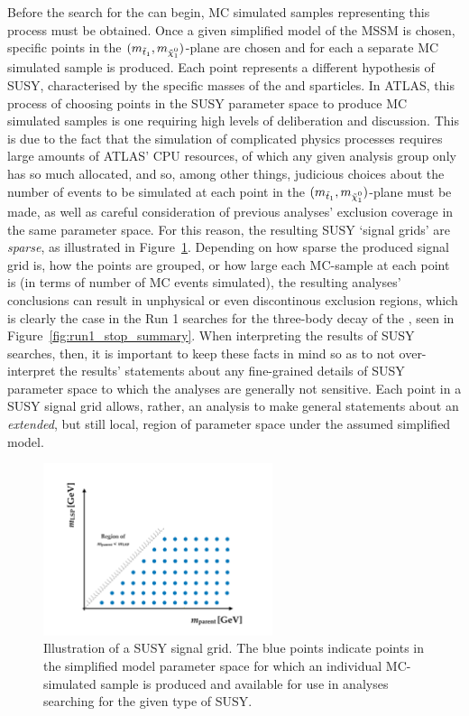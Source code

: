 Before the search for the \stopone can begin, MC simulated samples representing this process
must be obtained.
Once a given simplified model of the MSSM is chosen, specific points in the
$(m_{\stopone}, m_{\ninoone})$-plane are chosen and for each a separate MC simulated
sample is produced.
Each point represents a different hypothesis of SUSY, characterised by the specific masses
of the \stopone and \ninoone sparticles.
In ATLAS, this process of choosing points in the SUSY parameter space to produce MC simulated samples
is one requiring high levels of deliberation and discussion.
This is due to the fact that the simulation of complicated physics processes requires large amounts
of ATLAS' CPU resources, of which any given analysis group only has so much allocated, and so, among other things,
judicious choices about the number of events to be simulated at each point in the $(m_{\stopone}, m_{\ninoone})$-plane
must be made, as well as careful consideration of previous analyses' exclusion coverage in the same parameter space.
For this reason, the resulting SUSY `signal grids' are \textit{sparse}, as illustrated in Figure~\ref{fig:susy_signal_grid}.
Depending on how sparse the produced signal grid is, how the points are grouped, or how large each MC-sample at each
point is (in terms of number of MC events simulated), the resulting analyses' conclusions
can result in unphysical or even discontinous exclusion regions, which is clearly the case in the Run 1 searches
for the three-body decay of the \stopone, seen in Figure~\ref{fig:run1_stop_summary}.
When interpreting the results of SUSY searches, then, it is important to keep these facts in mind
so as to not over-interpret the results' statements about any fine-grained details of SUSY parameter space to
which the analyses are generally not sensitive.
Each point in a SUSY signal grid allows, rather, an analysis to make general statements about
an \textit{extended}, but still local, region of parameter space under the assumed simplified model.

\begin{figure}[!htb]
    \begin{center}
        \includegraphics[width=0.6\textwidth]{figures/search_stop2l/signal/susy_signal_grid_example}
        \caption{
            Illustration of a SUSY signal grid.
            The blue points indicate points in the simplified model parameter space for which
            an individual MC-simulated sample is produced and available for use in analyses
            searching for the given type of SUSY.
        }
        \label{fig:susy_signal_grid}
    \end{center}
\end{figure}

